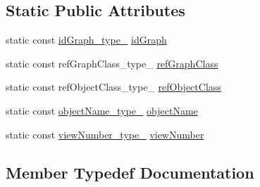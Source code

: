 \subsection*{Static Public Attributes}
\begin{DoxyCompactItemize}
\item 
static const \hyperlink{structodb_1_1query__columns_3_01_1_1_graph_00_01id__pgsql_00_01_a_01_4_a2e08560e3141bc01757b5ca76ccf7106}{id\+Graph\+\_\+type\+\_\+} \hyperlink{structodb_1_1query__columns_3_01_1_1_graph_00_01id__pgsql_00_01_a_01_4_a6c63f4c8e8d1b20ce4a472496affca45}{id\+Graph}
\item 
static const ref\+Graph\+Class\+\_\+type\+\_\+ \hyperlink{structodb_1_1query__columns_3_01_1_1_graph_00_01id__pgsql_00_01_a_01_4_a85755d03f15b35d1d7dbc16f8cf81854}{ref\+Graph\+Class}
\item 
static const ref\+Object\+Class\+\_\+type\+\_\+ \hyperlink{structodb_1_1query__columns_3_01_1_1_graph_00_01id__pgsql_00_01_a_01_4_aef92d581259eceb7e4a03eb138f066ee}{ref\+Object\+Class}
\item 
static const \hyperlink{structodb_1_1query__columns_3_01_1_1_graph_00_01id__pgsql_00_01_a_01_4_af1eaa59c77dd7e1dd9c1862e14eec294}{object\+Name\+\_\+type\+\_\+} \hyperlink{structodb_1_1query__columns_3_01_1_1_graph_00_01id__pgsql_00_01_a_01_4_a94d5ce7183b317b6eeb26a12ba6970f5}{object\+Name}
\item 
static const \hyperlink{structodb_1_1query__columns_3_01_1_1_graph_00_01id__pgsql_00_01_a_01_4_ab2eead097e6b06f77d6438902addfa9d}{view\+Number\+\_\+type\+\_\+} \hyperlink{structodb_1_1query__columns_3_01_1_1_graph_00_01id__pgsql_00_01_a_01_4_a443a7d11572f4fd05b99ba9c84280bda}{view\+Number}
\end{DoxyCompactItemize}


\subsection{Member Typedef Documentation}
\hypertarget{structodb_1_1query__columns_3_01_1_1_graph_00_01id__pgsql_00_01_a_01_4_a2e08560e3141bc01757b5ca76ccf7106}{}
